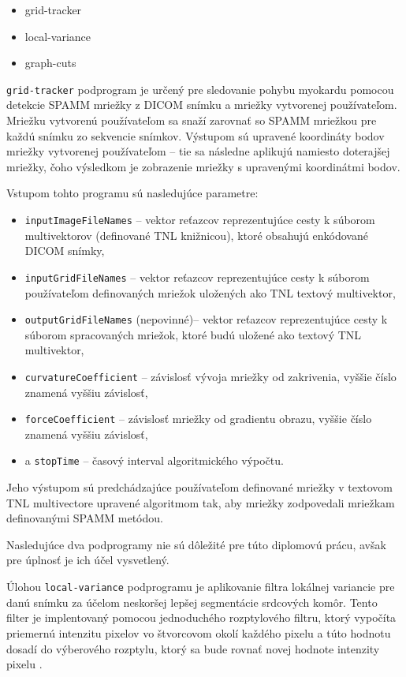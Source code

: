 \begin {itemize}
\item {grid-tracker}
\item {local-variance}
\item {graph-cuts}
\end {itemize}

\texttt{grid-tracker} podprogram je určený pre sledovanie pohybu myokardu pomocou detekcie SPAMM mriežky z DICOM snímku a mriežky vytvorenej používateľom. Mriežku vytvorenú používateľom sa snaží zarovnať so SPAMM mriežkou pre každú snímku zo sekvencie snímkov. Výstupom sú upravené koordináty bodov mriežky vytvorenej používateľom -- tie sa následne aplikujú namiesto doterajšej mriežky, čoho výsledkom je zobrazenie mriežky s upravenými koordinátmi bodov. \newline

Vstupom tohto programu sú nasledujúce parametre:
\begin {itemize}
\item {\texttt{inputImageFileNames} -- vektor reťazcov reprezentujúce cesty k súborom multivektorov (definované TNL knižnicou), ktoré obsahujú enkódované DICOM snímky,}
\item {\texttt{inputGridFileNames} -- vektor reťazcov reprezentujúce cesty k súborom používateľom definovaných mriežok uložených ako TNL textový multivektor,}
\item {\texttt{outputGridFileNames} (nepovinné)-- vektor reťazcov reprezentujúce cesty k súborom spracovaných mriežok, ktoré budú uložené ako textový TNL multivektor,}
\item {\texttt{curvatureCoefficient} -- závislosť vývoja mriežky od zakrivenia, vyššie číslo znamená vyššiu závislosť,}
\item {\texttt{forceCoefficient} -- závislosť mriežky od gradientu obrazu, vyššie číslo znamená vyššiu závislosť,}
\item {a \texttt{stopTime} -- časový interval algoritmického výpočtu.}
\end {itemize}

Jeho výstupom sú predchádzajúce používateľom definované mriežky v textovom TNL multivectore upravené algoritmom tak, aby mriežky zodpovedali mriežkam definovanými SPAMM metódou. \newline

Nasledujúce dva podprogramy nie sú dôležité pre túto diplomovú prácu, avšak pre úplnosť je ich účel vysvetlený. \newline

Úlohou \texttt{local-variance} podprogramu je aplikovanie filtra lokálnej variancie pre danú snímku za účelom neskoršej lepšej segmentácie srdcových komôr. Tento filter je implentovaný pomocou jednoduchého rozptylového filtru, ktorý vypočíta priemernú intenzitu pixelov vo štvorcovom okolí každého pixelu a túto hodnotu dosadí do výberového rozptylu, ktorý sa bude rovnať novej hodnote intenzity pixelu \cite{master_thesis_app}.

